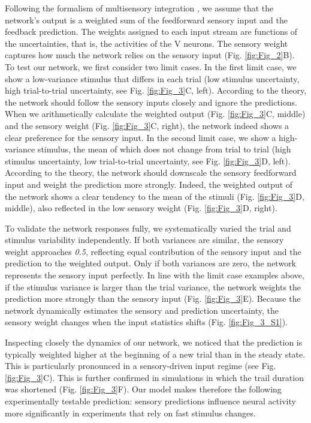 \documentclass[10pt,a4paper]{article}
\begin{document}
Following the formalism of multisensory integration \citep[see, e.g.][]{pouget2013probabilistic}, we assume that the network's output is a weighted sum of the feedforward sensory input and the feedback prediction. The weights assigned to each input stream are functions of the uncertainties, that is, the activities of the V neurons. The sensory weight captures how much the network relies on the sensory input (Fig. \ref{fig:Fig_2}B). To test our network, we first consider two limit cases. In the first limit case, we show a low-variance stimulus that differs in each trial (low stimulus uncertainty, high trial-to-trial uncertainty, see Fig. \ref{fig:Fig_3}C, left). According to the theory, the network should follow the sensory inputs closely and ignore the predictions. When we arithmetically calculate the weighted output (Fig. \ref{fig:Fig_3}C, middle) and the sensory weight (Fig. \ref{fig:Fig_3}C, right), the network indeed shows a clear preference for the sensory input. In the second limit case, we show a high-variance stimulus, the mean of which does not change from trial to trial (high stimulus uncertainty, low trial-to-trial uncertainty, see Fig. \ref{fig:Fig_3}D, left). According to the theory, the network should downscale the sensory feedforward input and weight the prediction more strongly. Indeed, the weighted output of the network shows a clear tendency to the mean of the stimuli (Fig. \ref{fig:Fig_3}D, middle), also reflected in the low sensory weight (Fig. \ref{fig:Fig_3}D, right). 

To validate the network responses fully, we systematically varied the trial and stimulus variability independently. If both variances are similar, the sensory weight approaches \textit{0.5}, reflecting equal contribution of the sensory input and the prediction to the weighted output. Only if both variances are zero, the network represents the sensory input perfectly. In line with the limit case examples above, if the stimulus variance is larger than the trial variance, the network weights the prediction more strongly than the sensory input (Fig. \ref{fig:Fig_3}E). Because the network dynamically estimates the sensory and prediction uncertainty, the sensory weight changes when the input statistics shifts (Fig. \ref{fig:Fig_3_S1}). 

Inspecting closely the dynamics of our network, we noticed that the prediction is typically weighted higher at the beginning of a new trial than in the steady state. This is particularly pronounced in a sensory-driven input regime (see Fig. \ref{fig:Fig_3}C). This is further confirmed in simulations in which the trail duration was shortened (Fig. \ref{fig:Fig_3}F). Our model makes therefore the following experimentally testable prediction: sensory predictions influence neural activity more significantly in experiments that rely on fast stimulus changes. 
\end{document}
